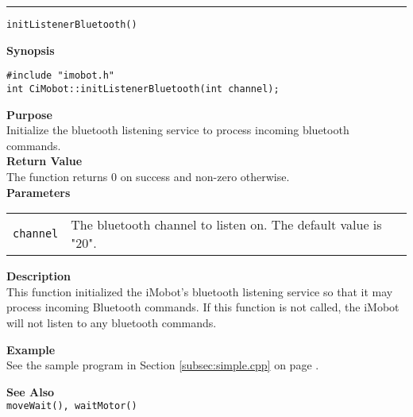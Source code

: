 \noindent
\vspace{5pt}
\rule{6.5in}{0.015in}
\noindent
{\LARGE \texttt{initListenerBluetooth()}}\\
{}

\noindent
{\bf Synopsis}\\
\begin{verbatim}
#include "imobot.h"
int CiMobot::initListenerBluetooth(int channel);
\end{verbatim}

\noindent
{\bf Purpose}\\
Initialize the bluetooth listening service to process incoming bluetooth commands.\\

\noindent
{\bf Return Value}\\
The function returns 0 on success and non-zero otherwise.\\

\noindent
{\bf Parameters}
\vspace{-0.1in}
\begin{description}
\item               
\begin{tabular}{p{20 mm}p{145 mm}}
\texttt{channel} & The bluetooth channel to listen on. The default value is "20". \\
\end{tabular}
\end{description}

\noindent
{\bf Description}\\
This function initialized the iMobot's bluetooth listening service so that it may process incoming Bluetooth commands. If this function is not called, the iMobot will not listen to any bluetooth commands.

\noindent
{\bf Example}\\
See the sample program in Section \ref{subsec:simple.cpp} on page \pageref{subsec:simple.cpp}.
\noindent

\noindent
{\bf See Also}\\
\texttt{moveWait(), waitMotor()}

